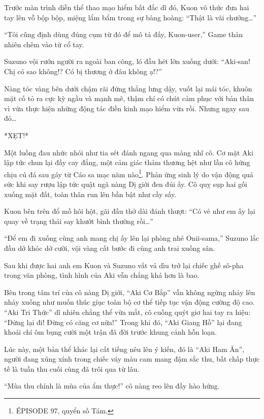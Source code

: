 \documentclass[../main.tex]{subfiles}
\begin{document}
Trước màn trình diễn thể thao mạo hiểm bất đắc dĩ đó, Kuon vô thức đưa hai tay lên vỗ bộp bộp, miệng lẩm bẩm trong sự bàng hoàng: ``Thật là vãi chưởng\dots''

``Tôi cũng định dùng đúng cụm từ đó để mô tả đấy, Kuon-user,'' Game thản nhiên chêm vào từ cổ tay.

Suzuno vội rướn người ra ngoài ban công, ló đầu hét lớn xuống dưới: ``Aki-san! Chị có sao không!? Có bị thương ở đâu không ạ!?''

Nàng tóc vàng bên dưới chậm rãi đứng thẳng lưng dậy, vuốt lại mái tóc, khuôn mặt cố tỏ ra cực kỳ ngầu và mạnh mẽ, thậm chí có chút cảm phục với bản thân vì vừa thực hiện những động tác điền kinh mạo hiểm vừa rồi. Nhưng ngay sau đó\dots

*XẸT!*

Một luồng đau nhức nhói như tia sét đánh ngang qua màng nhĩ cô. Cơ mặt Aki lập tức chun lại đầy cay đắng, một cảm giác thảm thương hệt như lần cô hứng chịu cú đá sau gáy từ Cáo sa mạc năm nào\footnote{{\flaregothic ÉPISODE 97}, quyển số Tám.}. Phản ứng sinh lý do vận động quá sức khi say rượu lập tức quật ngã nàng Dị giới đen đủi ấy. Cô quỵ sụp hai gối xuống mặt đất, toàn thân run lên bần bật như cầy sấy.

Kuon bên trên đổ mồ hôi hột, gãi đầu thở dài đánh thượt: ``Có vẻ như em ấy lại quay về trạng thái say khướt bình thường rồi\dots''

``Để em đi xuống cùng anh mang chị ấy lên lại phòng nhé Onii-sama,'' Suzuno lắc đầu dở khóc dở cười, vội vàng cất bước đi cùng anh trai xuống sân.

\ct

Sau khi được hai anh em Kuon và Suzuno vất vả dìu trở lại chiếc ghế sô-pha trong văn phòng, tình hình của Aki vẫn chẳng khá hơn là bao.

Bên trong tâm trí của cô nàng Dị giới, ``Aki Cơ Bắp'' vẫn không ngừng nhảy lên nhảy xuống như muốn thúc giục toàn bộ cơ thể tiếp tục vận động cường độ cao. ``Aki Tri Thức'' dĩ nhiên chẳng thể vừa mắt, cô cuống quýt giơ hai tay ra hiệu: ``Dừng lại đi! Đừng có căng cơ nữa!'' Trong khi đó, ``Aki Giang Hồ'' lại đang khoái chí ôm bụng cười một trận đã đời trước khung cảnh hỗn loạn.

Lúc này, một bản thể khác lại cất tiếng nêu lên ý kiến, đó là ``Aki Ham Ăn'', người đang xúng xính trong chiếc váy màu cam mang đậm sắc thu, bất chấp thực tế là tuần thu cuối cùng đã trôi qua từ lâu.

``Mùa thu chính là mùa của ẩm thực!'' cô nàng reo lên đầy hào hứng.
\end{document}
